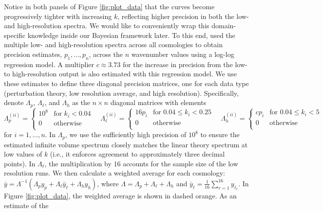 \documentclass[11pt]{article}
\begin{document}
Notice in both panels of Figure \ref{fig:plot_data} that the curves 
become progressively tighter with increasing $k$, reflecting higher precision in both 
the low- and high-resolution spectra. We would like to conveniently wrap this domain-specific 
knowledge inside our Bayesian framework later.  To this end, \cite{moran2023mira} 
used the multiple low- and high-resolution spectra across all cosmologies to
obtain precision estimates, $p_1,\dots, p_n$, across the $n$ 
wavenumber values using a log-log regression model. A multiplier $c\approx 3.73$ for 
the increase in precision from the low- to high-resolution output is also 
estimated with this regression model. 
We use these estimates to define three 
diagonal precision matrices, one for each data type (perturbation theory, 
low resolution average, and high resolution). Specifically, denote $\Lambda_p$, 
$\Lambda_\ell$, and $\Lambda_h$ as the $n\times n$ diagonal matrices with elements
\begin{equation}\label{eq:lambda}
\Lambda_p^{(ii)} = \begin{cases}
    10^8 &\text{for } k_i < 0.04 \\
    0  &\text{otherwise}\\
    \end{cases}
\quad
\Lambda_\ell^{(ii)} = \begin{cases}
    16p_i &\text{for } 0.04 \leq k_i < 0.25 \\
    0  &\text{otherwise}\\
    \end{cases}
\quad
\Lambda_h^{(ii)} = \begin{cases}
    cp_i &\text{for } 0.04 \leq k_i < 5 \\
    0  &\text{otherwise}\\
    \end{cases}
\end{equation}
for $i=1,\dots, n$.  In $\Lambda_p$, we use the sufficiently high precision of $10^8$ 
to ensure the estimated infinite volume spectrum closely matches the linear theory 
spectrum at low values of $k$ (i.e., it enforces agreement to approximately three 
decimal points). In $\Lambda_\ell$, the multiplication by 16 accounts for the sample 
size of the low resolution runs.
We then calculate a weighted average for each cosmology: 
$\bar y = \Lambda^{-1}(\Lambda_p y_p + \Lambda_{\ell} \bar{y}_\ell + \Lambda_h y_h)$, 
where $\Lambda = \Lambda_p + \Lambda_\ell + \Lambda_h$ and 
$\bar{y}_\ell = \frac{1}{16}\sum_{r=1}^{16} y_{\ell_r}$. In Figure \ref{fig:plot_data},
the weighted average is shown in dashed orange.  As an estimate of the
\end{document}

